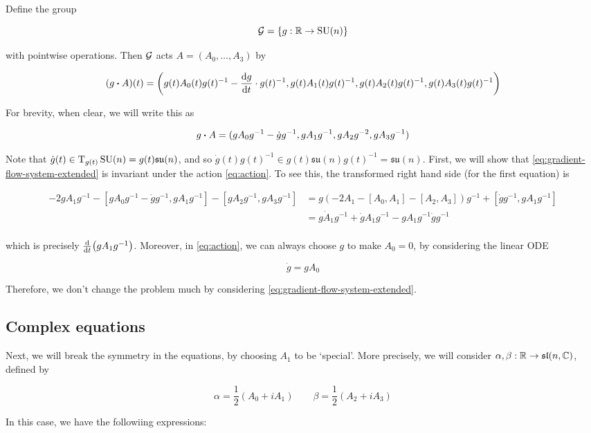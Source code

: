 \documentclass{article}
\DeclareMathOperator{\SU}{SU}
\newcommand{\su}{\mathfrak{su}}
\renewcommand{\sl}{\mathfrak{sl}}
\begin{document}
Define the group

\[\mcG = \left\{g : \R \to \SU(n)\right\}\]

with pointwise operations. Then \(\mathcal{G}\) acts \(A = (A_0, \dots, A_3)\) by

\begin{equation}
    \label{eq:action}
    (g \vdot A)(t) = \left(g(t)A_0(t)g(t)^{-1} - \dv{g}{t}(t) \cdot g(t)^{-1}, g(t)A_1(t)g(t)^{-1}, g(t)A_2(t)g(t)^{-1}, g(t)A_3(t)g(t)^{-1}\right)
\end{equation}

For brevity, when clear, we will write this as

\[g \vdot A = (gA_0g^{-1} - \dot g g^{-1}, gA_1g^{-1}, gA_2g^{-2}, gA_3g^{-1})\]

Note that \(\dot g(t) \in \TT_{g(t)}\SU(n) = g(t)\su(n)\), and so \(\dot g(t)g(t)^{-1} \in g(t)\su(n)g(t)^{-1} = \su(n)\). First, we will show that \cref{eq:gradient-flow-system-extended} is invariant under the action \cref{eq:action}. To see this, the transformed right hand side (for the first equation) is

\begin{align*}
    -2gA_1g^{-1} - [gA_0g^{-1} - \dot g g^{-1}, gA_1g^{-1}] - [gA_2g^{-1}, gA_3g^{-1}] &= g(-2A_1 - [A_0, A_1] - [A_2, A_3])g^{-1} + [\dot g g^{-1}, gA_1g^{-1}] \\
    &= g\dot A_1g^{-1} + \dot g A_1 g^{-1} - gA_1g^{-1}\dot g g^{-1} \\
\end{align*}

which is precisely \(\dv{t}(gA_1g^{-1})\). Moreover, in \cref{eq:action}, we can always choose \(g\) to make \(A_0 = 0\), by considering the linear ODE

\[\dot g = gA_0\]

Therefore, we don't change the problem much by considering \cref{eq:gradient-flow-system-extended}. 

\subsection{Complex equations}

Next, we will break the symmetry in the equations, by choosing \(A_1\) to be `special'. More precisely, we will consider \(\alpha, \beta : \R \to \sl(n, \C)\), defined by

\[\alpha = \frac{1}{2}(A_0 + iA_1) \qquad \beta = \frac{1}{2}(A_2 + iA_3)\]

In this case, we have the followiing expressions:
\end{document}
